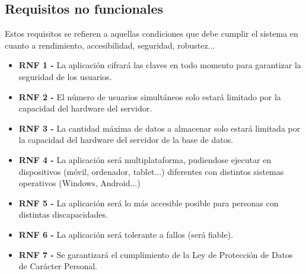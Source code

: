 \subsection{Requisitos no funcionales}
Estos requisitos se refieren a aquellas condiciones que debe cumplir el sistema en cuanto a rendimiento, accesibilidad, seguridad, robustez...
\begin{itemize}
    \item \textbf{RNF 1 - } La aplicación cifrará las claves en todo momento para garantizar la seguridad de los usuarios.
    \item \textbf{RNF 2 - } El número de usuarios simultáneos solo estará limitado por la capacidad del hardware del servidor.
    \item \textbf{RNF 3 - } La cantidad máxima de datos a almacenar solo estará limitada por la capacidad del hardware del servidor de la base de datos.
    \item \textbf{RNF 4 - } La aplicación será multiplataforma, pudiendose ejecutar en dispositivos (móvil, ordenador, tablet...) diferentes con distintos sistemas operativos (Windows, Android...)
    \item \textbf{RNF 5 - } La aplicación será lo más accesible posible para personas con distintas discapacidades. 
    \item \textbf{RNF 6 - } La aplicación será tolerante a fallos (será fiable).
    \item \textbf{RNF 7 - } Se garantizará el cumplimiento de la Ley de Protección de Datos de Carácter Personal.
\end{itemize}



